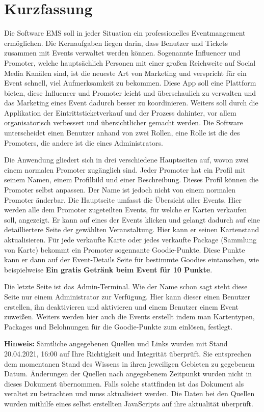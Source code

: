 \chapter{Kurzfassung}
Die Software EMS soll in jeder Situation ein professionelles Eventmangement ermöglichen.
Die Kernaufgaben liegen darin, dass Benutzer und Tickets zusammen mit Events verwaltet werden können.
Sogenannte Influencer und Promoter, welche hauptsächlich Personen mit einer großen Reichweite auf Social Media Kanälen sind, ist die neueste Art von Marketing und verspricht für ein Event schnell, viel Aufmerksamkeit zu bekommen.
Diese App soll eine Plattform bieten, diese Influencer und Promoter leicht und überschaulich zu verwalten und das Marketing eines Event dadurch besser zu koordinieren.
Weiters soll durch die Applikation der Eintrittsticketverkauf und der Prozess dahinter, vor allem organisatorisch verbessert und übersichtlicher gemacht werden. 
Die Software unterscheidet einen Benutzer anhand von zwei Rollen, eine Rolle ist die des Promoters, die andere ist die eines Administrators.

Die Anwendung gliedert sich in drei verschiedene Hauptseiten auf, wovon zwei einem normalen Promoter zugänglich sind.
Jeder Promoter hat ein Profil mit seinem Namen, einem Profilbild und einer Beschreibung. Dieses Profil können die Promoter selbst anpassen. Der Name ist jedoch nicht von einem normalen Promoter änderbar.
Die Hauptseite umfasst die Übersicht aller Events. Hier werden alle dem Promoter zugeteilten Events, für welche er Karten verkaufen soll, angezeigt.
Er kann auf eines der Events klicken und gelangt dadurch auf eine detailliertere Seite der gewählten Veranstaltung.
Hier kann er seinen Kartenstand aktualisieren. Für jede verkaufte Karte oder jedes verkaufte Package (Sammlung von Karte) bekommt ein Promoter sogennante Goodie-Punkte.
Diese Punkte kann er dann auf der Event-Details Seite für bestimmte Goodies eintauschen, wie beispielweise \textbf{Ein gratis Getränk beim Event für 10 Punkte}.

Die letzte Seite ist das Admin-Terminal. Wie der Name schon sagt steht diese Seite nur einem Administrator zur Verfügung.
Hier kann dieser einen Benutzer erstellen, ihn deaktivieren und aktivieren und einem Benutzer einem Event zuweißen.
Weiters werden hier auch die Events erstellt indem man Kartentypen, Packages und Belohnungen für die Goodie-Punkte zum einlösen, festlegt.

\textbf{Hinweis:} Sämtliche angegebenen Quellen und Links wurden mit Stand 20.04.2021, 16:00 auf Ihre Richtigkeit und Integrität überprüft.
Sie entsprechen dem momentanen Stand des Wissens in ihren jeweiligen Gebieten zu gegebenem Datum.
Änderungen der Quellen nach angegebenem Zeitpunkt wurden nicht in dieses Dokument übernommen.
Falls solche stattfinden ist das Dokument als veraltet zu betrachten und muss aktualisiert werden.
Die Daten bei den Quellen wurden mithilfe eines selbst erstellten JavaScripts auf ihre aktualität überprüft.